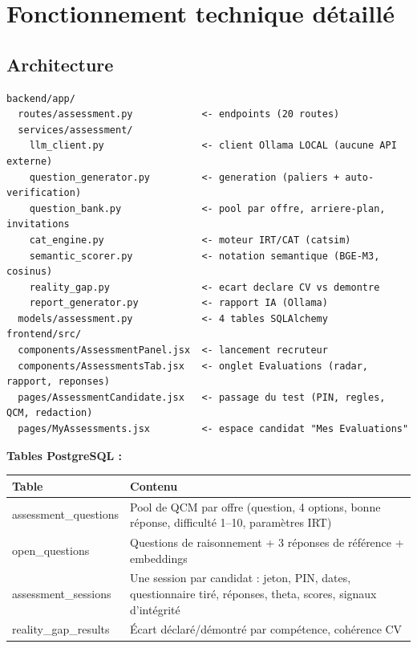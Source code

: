 \documentclass[11pt,a4paper]{article}
\begin{document}
\section{Fonctionnement technique détaillé}

\subsection{Architecture}
\begin{lstlisting}
backend/app/
  routes/assessment.py            <- endpoints (20 routes)
  services/assessment/
    llm_client.py                 <- client Ollama LOCAL (aucune API externe)
    question_generator.py         <- generation (paliers + auto-verification)
    question_bank.py              <- pool par offre, arriere-plan, invitations
    cat_engine.py                 <- moteur IRT/CAT (catsim)
    semantic_scorer.py            <- notation semantique (BGE-M3, cosinus)
    reality_gap.py                <- ecart declare CV vs demontre
    report_generator.py           <- rapport IA (Ollama)
  models/assessment.py            <- 4 tables SQLAlchemy
frontend/src/
  components/AssessmentPanel.jsx  <- lancement recruteur
  components/AssessmentsTab.jsx   <- onglet Evaluations (radar, rapport, reponses)
  pages/AssessmentCandidate.jsx   <- passage du test (PIN, regles, QCM, redaction)
  pages/MyAssessments.jsx         <- espace candidat "Mes Evaluations"
\end{lstlisting}

\noindent\textbf{Tables PostgreSQL :}
\begin{center}
\begin{tabularx}{\textwidth}{>{\ttfamily}p{4.6cm}X}
\toprule
\textrm{\textbf{Table}} & \textbf{Contenu} \\
\midrule
assessment\_questions & Pool de QCM par offre (question, 4 options, bonne réponse,
difficulté 1--10, paramètres IRT) \\
open\_questions & Questions de raisonnement + 3 réponses de référence + embeddings \\
assessment\_sessions & Une session par candidat : jeton, PIN, dates, questionnaire tiré,
réponses, theta, scores, signaux d'intégrité \\
reality\_gap\_results & Écart déclaré/démontré par compétence, cohérence CV \\
\bottomrule
\end{tabularx}
\end{center}
\end{document}
